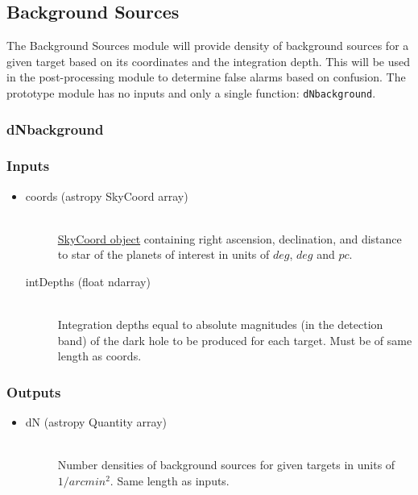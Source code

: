 \documentclass[cleanfoot]{asme2ej}
\begin{document}
\subsection{Background Sources}\label{sec:backgroundsources}

The Background Sources module will provide density of background sources for a given target based on its coordinates and the integration depth.  This will be used in the post-processing module to determine false alarms based on confusion.  The prototype module has no inputs and only a single function: \verb+dNbackground+.

\subsubsection{dNbackground}
\subsubsection*{Inputs}
\begin{itemize}
    \item 
    \begin{description}
        \item[coords (astropy SkyCoord array)] \hfill \\ \href{http://astropy.readthedocs.org/en/latest/api/astropy.coordinates.SkyCoord.html}{SkyCoord object} containing right ascension, declination, and  distance to star of the planets of interest in units of $ deg $, $ deg $ and $ pc $.
        \item[intDepths (float ndarray)] \hfill \\ Integration depths equal to absolute magnitudes (in the detection band) of the dark hole to be produced for each target. Must be of same length as coords.
    \end{description}
\end{itemize}
\subsubsection*{Outputs}
\begin{itemize}
    \item 
    \begin{description}
        \item[dN (astropy Quantity array)] \hfill \\
        Number densities of background sources for given targets in  units of $ 1/arcmin^2 $. Same length as inputs.
    \end{description}
\end{itemize}
\end{document}
